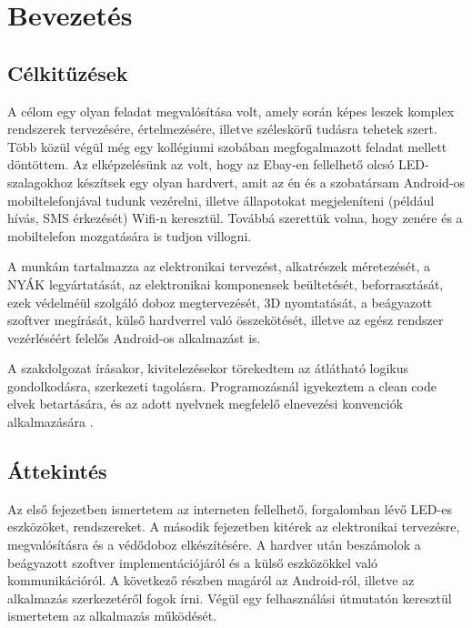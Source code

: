 \documentclass[../main.tex]{subfiles}
\begin{document}
\section{Bevezetés}
    \subsection{Célkitűzések}
        A célom egy olyan feladat megvalósítása volt, amely során képes leszek komplex rendszerek tervezésére, értelmezésére, illetve széleskörű tudásra tehetek szert. Több közül végül még egy kollégiumi szobában megfogalmazott feladat mellett döntöttem. 
        Az elképzelésünk az volt, hogy az Ebay-en fellelhető olcsó LED-szalagokhoz készítsek egy olyan hardvert, amit az én és a szobatársam Android-os mobiltelefonjával tudunk vezérelni, illetve állapotokat megjeleníteni (például hívás, SMS érkezését) Wifi-n keresztül. Továbbá szerettük volna, hogy zenére és a mobiltelefon mozgatására is tudjon villogni. 
        
        A munkám tartalmazza az elektronikai tervezést, alkatrészek méretezését, a NYÁK legyártatását, az elektronikai komponensek beültetését, beforrasztását, ezek védelméül szolgáló doboz megtervezését, 3D nyomtatását, a beágyazott szoftver megírását, külső hardverrel való összekötését, illetve az egész rendszer vezérléséért felelős Android-os alkalmazást is.
        
        A szakdolgozat írásakor, kivitelezésekor törekedtem az átlátható logikus gondolkodásra, szerkezeti tagolásra. Programozásnál igyekeztem a clean code elvek betartására, és az adott nyelvnek megfelelő elnevezési konvenciók alkalmazására \cite{b_embedded_c_coding}\cite{b_programming_embedded_systems}\cite{android_clean_code}.
        
    \subsection{Áttekintés}
        Az első fejezetben ismertetem az interneten fellelhető, forgalomban lévő LED-es eszközöket, rendszereket.
        A második fejezetben kitérek az elektronikai tervezésre, megvalósításra és a védődoboz elkészítésére.
        A hardver után beszámolok a beágyazott szoftver implementációjáról és a külső eszközökkel való kommunikációról.
        A következő részben magáról az Android-ról, illetve az alkalmazás szerkezetéről fogok írni. Végül egy felhasználási útmutatón keresztül ismertetem az alkalmazás működését.
\end{document}
